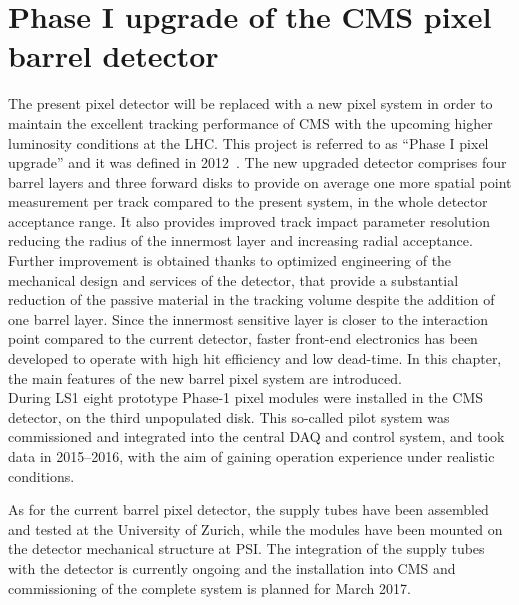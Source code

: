 \chapter{Phase I upgrade of the CMS pixel barrel detector}
\label{ch:Phase1Intro}

The present pixel detector will be replaced with a new pixel system in order to maintain the excellent tracking performance of CMS with the upcoming higher luminosity conditions at the LHC.
This project is referred to as ``Phase I pixel upgrade'' and it was defined in 2012~\cite{Dominguez:1481838}. The new upgraded detector comprises four barrel layers and three forward disks to provide on average one more spatial point measurement per track compared to the present system, in the whole detector acceptance range. It also provides improved track impact parameter resolution reducing the radius of the innermost layer and increasing radial acceptance. 
Further improvement is obtained thanks to optimized engineering of the mechanical design and services of the detector, that provide a substantial reduction of the passive material in the tracking volume despite the addition of one barrel layer. Since the innermost sensitive layer is closer to the interaction point compared to the current detector, faster front-end electronics has been developed to operate with high hit efficiency and low dead-time.
In this chapter, the main features of the new barrel pixel system are introduced.\\

During LS1 eight prototype Phase-1 pixel modules were installed in the CMS detector, on the third unpopulated disk. This so-called pilot system was commissioned and integrated into the central DAQ and control system, and took data in 2015--2016, with the aim of gaining operation experience under realistic conditions.

As for the current barrel pixel detector, the supply tubes have been assembled and tested at the University of Zurich, while the modules have been mounted on the detector mechanical structure at PSI. The integration of the supply tubes with the detector is currently ongoing and the installation into CMS and commissioning of the complete system is planned for March 2017.


